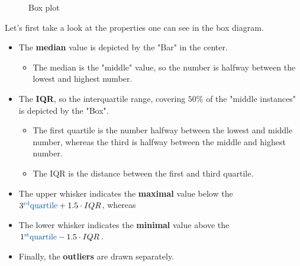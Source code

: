 \begin{figure}[h]
  \centering
  \hspace*{0.05\textwidth}
  \caption{Box plot}
  \label{fig:2_box_plot}
\end{figure}

Let's first take a look at the properties one can see in the box diagram. 
\begin{itemize}
  \item The \textbf{median} value is depicted by the "Bar" in the center.
  \begin{itemize}
    \item The median is the "middle" value, so the number is halfway between the lowest and highest number.
  \end{itemize}
  \item The \textbf{IQR}, so the interquartile range, covering $50\%$ of the "middle instances" is depicted by the "Box".
  \begin{itemize}
    \item The first quartile is the number halfway between the lowest and middle number, whereas the third is halfway between the middle and highest number.
    \item The IQR is the distance between the first and third quartile.
  \end{itemize}
  \item The upper whisker indicates the \textbf{maximal} value below the $3^{\text{\color{mathblue}rd}} \text{\color{mathblue} quartile} + 1.5\cdot IQR$, whereas
  \item The lower whisker indicates the \textbf{minimal} value above the $1^{\text{\color{mathblue}st}} \text{\color{mathblue} quartile} - 1.5\cdot IQR$.
  \item Finally, the \textbf{outliers} are drawn separately.
\end{itemize}

